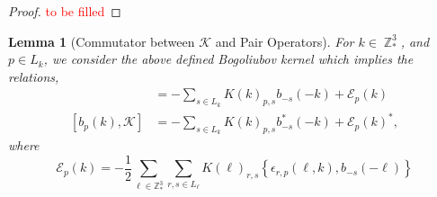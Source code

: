 \documentclass[sn-mathphys, Numbered ,a4paper]{sn-jnl}%
\DeclareMathOperator{\Z}{\mathbb{Z}}
\theoremstyle{plain}
\newtheorem{lemma}[theorem]{Lemma}
\theoremstyle{definition}
\theoremstyle{remark}
\theoremstyle{plain}
\theoremstyle{definition}
\theoremstyle{remark}
\begin{document}
\begin{proof}
    \textcolor{red}{to be filled}
\end{proof}
\begin{lemma}[Commutator between $\mathcal{K} $ and Pair Operators]
For $k \in \Z^3_*$, and $p \in L_{k}$, we consider the above defined Bogoliubov kernel which implies the relations,
\begin{align}
    [b^*_p(k),\mathcal{K}] &=-\sum\limits_{s\in L_{k}}K(k)_{p,s}b_{-s}(-k) + \mathcal{E}_{p}(k)\label{eq:13} \\
    [b_p(k),\mathcal{K}] &=-\sum\limits_{s\in L_{k}}K(k)_{p,s}b^*_{-s}(-k) + \mathcal{E}_{p}(k)^*\label{eq:14},
\end{align}
    where
\begin{equation}\label{eq:commerrKb}
    \mathcal{E}_{p}(k) = -\frac{1}{2}\sum\limits_{\ell\in \mathbb{Z}^3_*}\sum\limits_{r,s\in L_\ell}K(\ell)_{r,s}\left\{\epsilon_{r,p}(\ell,k),b_{-s}(-\ell)\right\} 
\end{equation}
\end{lemma}
\end{document}
